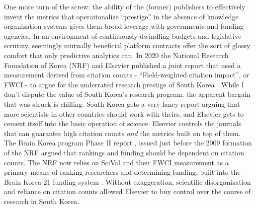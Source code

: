 One more turn of the screw: the ability of the (former) publishers to
effectively invent the metrics that operationalize ``prestige'' in the
absence of knowledge organization systems gives them broad leverage with
governments and funding agencies. In an environment of continuously
dwindling budgets and legislative scrutiny, seemingly mutually
beneficial platform contracts offer the sort of glossy comfort that only
predictive analytics can. In 2020 the National Research Foundation of
Korea (NRF) and Elsevier published a joint report that used a
measurement derived from citation counts - ``Field-weighted citation
impact'', or FWCI - to argue for the underrated research prestige of
South Korea \citep{researchfoundationofkoreaSouthKoreaTechnological2020} . While I don't
dispute the value of South Korea's research program, the apparent
bargain that was struck is chilling. South Korea gets a very fancy
report arguing that more scientists in other countries should work with
theirs, and Elsevier gets to cement itself into the basic operation of
science. Elsevier controls the journals that can guarantee high citation
counts \emph{and} the metrics built on top of them. The Brain Korea
program Phase II report  \citep{seongBrainKorea212008} , issued just before the 2009 formation of the
NRF argued that rankings and funding should be dependent on citation
counts. The NRF now relies on SciVal and their FWCI measurement as a
primary means of ranking researchers and determining funding, built into
the Brain Korea 21 funding system \citep{elsevierCaseStudyNational2019, elsevierkoreaSciValHwalyongeulWihan2021} . Without exaggeration, scientific disorganization and reliance on
citation counts allowed Elsevier to buy control over the course of
research in South Korea.

